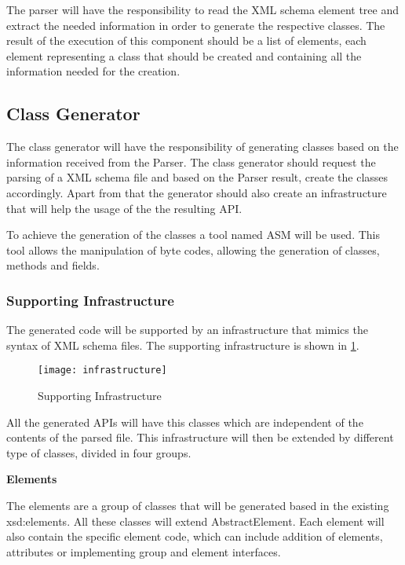 The parser will have the responsibility to read the XML schema element tree and extract the needed information in order to generate the respective classes. The result of the execution of this component should be a list of elements, each element representing a class that should be created and containing all the information needed for the creation.

\subsection{Class Generator}

The class generator will have the responsibility of generating classes based on the information received from the Parser. The class generator should request the parsing of a XML schema file and based on the Parser result, create the classes accordingly. Apart from that the generator should also create an infrastructure that will help the usage of the the resulting API. 

\noindent
To achieve the generation of the classes a tool named ASM will be used. This tool allows the manipulation of byte codes, allowing the generation of classes, methods and fields. 

\newpage

\subsubsection{Supporting Infrastructure}

The generated code will be supported by an infrastructure that mimics the syntax of XML schema files. The supporting infrastructure is shown in \ref{Infrastructure}.

\begin{figure}[h]
	\centering
	\texttt{[image: infrastructure]}
	\caption{Supporting Infrastructure}
	\label{Infrastructure}
\end{figure}

\noindent
All the generated APIs will have this classes which are independent of the contents of the parsed file. This infrastructure will then be extended by different type of classes, divided in four groups.

\textbf{Elements}

The elements are a group of classes that will be generated based in the existing xsd:elements. All these classes will extend AbstractElement. Each element will also contain the specific element code, which can include addition of elements, attributes or implementing group and element interfaces.

